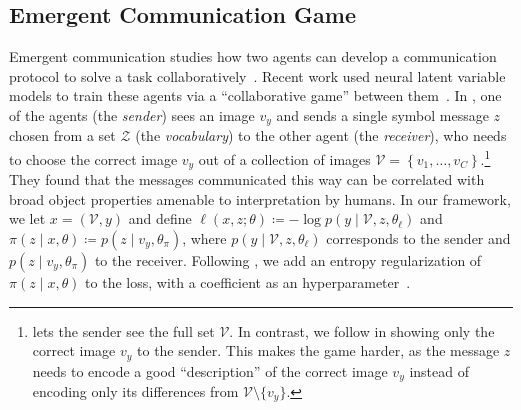 \subsection{Emergent Communication Game}\label{sec:comm}

Emergent communication studies how two agents can develop a
communication protocol to solve a task
collaboratively~\citep{kirby2002natural}. Recent work used neural
latent variable models to train these agents via a ``collaborative
game'' between
them~\citep{lewis1969convention,Lazaridou2017,Havrylov2017,
    jorge2016learning, foerster2016learning, sukhbaatar2016learning}. In
\citet{Lazaridou2017}, one of the agents (the \emph{sender}) sees an
image $v_y$ and sends a single symbol message $z$ chosen from a set
$\mathcal{Z}$ (the \emph{vocabulary}) to the other agent (the
\emph{receiver}), who needs to choose the correct image $v_y$ out of
a collection of images $\mathcal{V} = \left\{ v_1, \dots, v_C
    \right\}$.\footnote{\citet{Lazaridou2017} lets the sender see the
    full set $\mathcal{V}$. In contrast, we follow \citet{Havrylov2017}
    in showing only the correct image $v_y$ to the sender. This makes the
    game harder, as the message $z$ needs to encode a good
    ``description'' of the correct image $v_y$ instead of encoding only
    its differences from $\mathcal{V}\setminus \{v_y\}$.} They found that
the messages communicated this way can be correlated with broad
object properties amenable to interpretation by humans. In our
framework, we let $x = (\mathcal{V}, y)$ and define $\ell (x, z;
    \theta) \coloneqq -\log p(y \mid \mathcal{V}, z, \theta_\ell)$ and
$\pi (z \mid x, \theta) \coloneqq p(z \mid v_y, \theta_\pi)$, where
$p(y \mid \mathcal{V}, z, \theta_\ell)$ corresponds to the sender and
$p(z \mid v_y, \theta_\pi)$ to the receiver. Following
\citet{Lazaridou2017}, we add an entropy regularization of $\pi (z
    \mid x, \theta)$ to the loss, with a coefficient as an
hyperparameter~\citep{Mnih2016}.

